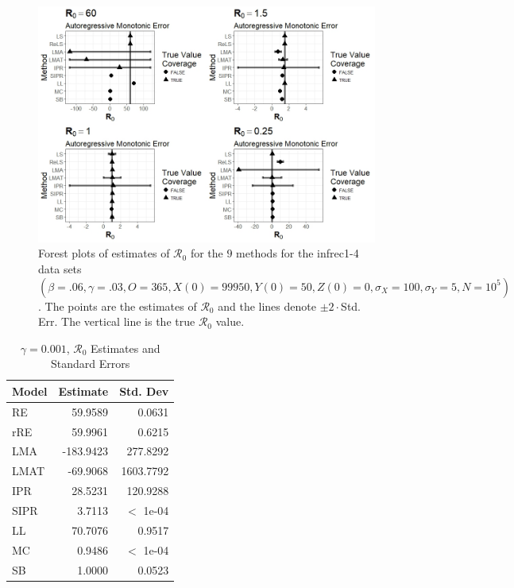 \documentclass[12pt]{article}
\newcommand{\xxsir}{\ensuremath{9} } %
\newcommand{\rr}{\ensuremath{\mathcal{R}_0}}
\begin{document}
\begin{figure}[H]
	\centering
	\includegraphics[scale=0.5]{images/parchange_arm.jpeg}
	\caption{Forest plots of estimates of $\rr$ for the \xxsir methods for the infrec1-4 data sets $(\beta=.06, \gamma=.03, O=365, X(0)=99950, Y(0)=50, Z(0)=0, \sigma_X=100, \sigma_Y=5, N=10^5)$.  The points are the estimates of $\rr$ and the lines denote $\pm 2\cdot $Std. Err.  The vertical line is the true $\rr$ value.}
\end{figure}
\begin{table}[H]
	
	\centering
	\begin{tabular}[t]{l|r|r}
		\hline
		Model & Estimate & Std. Dev\\
		\hline
		RE & 59.9589 & 0.0631\\
		\hline
		rRE & 59.9961 & 0.6215\\
		\hline
		LMA & -183.9423 & 277.8292\\
		\hline
		LMAT & -69.9068 & 1603.7792\\
		\hline
		IPR & 28.5231 & 120.9288\\
		\hline
		SIPR & 3.7113 & $<$ 1e-04\\
		\hline
		LL & 70.7076 & 0.9517\\
		\hline
		MC & 0.9486 & $<$ 1e-04\\
		\hline
		SB & 1.0000 & 0.0523\\
		\hline
	\end{tabular}
	\caption{$\gamma = 0.001$, $\rr$ Estimates and Standard Errors}
\end{table}
\end{document}
